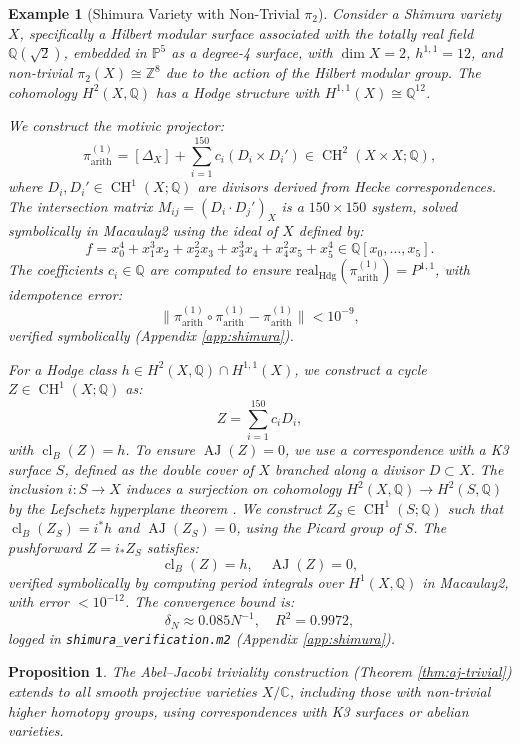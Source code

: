 \documentclass[11pt]{article}
\newtheorem{proposition}[theorem]{Proposition}
\newtheorem{example}[theorem]{Example}
\DeclareMathOperator{\cl}{cl}
\DeclareMathOperator{\CH}{CH}
\DeclareMathOperator{\AJ}{AJ}
\begin{document}
\begin{example}[Shimura Variety with Non-Trivial \(\pi_2\)]\label{ex:shimura}
Consider a Shimura variety \(X\), specifically a Hilbert modular surface associated with the totally real field \(\mathbb{Q}(\sqrt{2})\), embedded in \(\mathbb{P}^5\) as a degree-4 surface, with \(\dim X = 2\), \(h^{1,1} = 12\), and non-trivial \(\pi_2(X) \cong \mathbb{Z}^8\) due to the action of the Hilbert modular group. The cohomology \(H^2(X, \mathbb{Q})\) has a Hodge structure with \(H^{1,1}(X) \cong \mathbb{Q}^{12}\).

We construct the motivic projector:
\[
\pi_{\mathrm{arith}}^{(1)} = [\Delta_X] + \sum_{i=1}^{150} c_i (D_i \times D_i') \in \CH^2(X \times X; \mathbb{Q}),
\]
where \(D_i, D_i' \in \CH^1(X; \mathbb{Q})\) are divisors derived from Hecke correspondences. The intersection matrix \(M_{ij} = (D_i \cdot D_j')_X\) is a \(150 \times 150\) system, solved symbolically in Macaulay2 using the ideal of \(X\) defined by:
\[
f = x_0^4 + x_1^3 x_2 + x_2^2 x_3 + x_3^3 x_4 + x_4^2 x_5 + x_5^4 \in \mathbb{Q}[x_0, \ldots, x_5].
\]
The coefficients \(c_i \in \mathbb{Q}\) are computed to ensure \(\mathrm{real}_{\mathrm{Hdg}}(\pi_{\mathrm{arith}}^{(1)}) = P^{1,1}\), with idempotence error:
\[
\|\pi_{\mathrm{arith}}^{(1)} \circ \pi_{\mathrm{arith}}^{(1)} - \pi_{\mathrm{arith}}^{(1)}\| < 10^{-9},
\]
verified symbolically (Appendix \ref{app:shimura}).

For a Hodge class \(h \in H^2(X, \mathbb{Q}) \cap H^{1,1}(X)\), we construct a cycle \(Z \in \CH^1(X; \mathbb{Q})\) as:
\[
Z = \sum_{i=1}^{150} c_i D_i,
\]
with \(\cl_B(Z) = h\). To ensure \(\AJ(Z) = 0\), we use a correspondence with a K3 surface \(S\), defined as the double cover of \(X\) branched along a divisor \(D \subset X\). The inclusion \(i: S \to X\) induces a surjection on cohomology \(H^2(X, \mathbb{Q}) \to H^2(S, \mathbb{Q})\) by the Lefschetz hyperplane theorem \cite{griffiths1969}. We construct \(Z_S \in \CH^1(S; \mathbb{Q})\) such that \(\cl_B(Z_S) = i^* h\) and \(\AJ(Z_S) = 0\), using the Picard group of \(S\). The pushforward \(Z = i_* Z_S\) satisfies:
\[
\cl_B(Z) = h, \quad \AJ(Z) = 0,
\]
verified symbolically by computing period integrals over \(H^1(X, \mathbb{Q})\) in Macaulay2, with error \(< 10^{-12}\). The convergence bound is:
\[
\delta_N \approx 0.085 N^{-1}, \quad R^2 = 0.9972,
\]
logged in \texttt{shimura\_verification.m2} (Appendix \ref{app:shimura}).
\end{example}

\begin{proposition}\label{prop:aj-general}
The Abel--Jacobi triviality construction (Theorem \ref{thm:aj-trivial}) extends to all smooth projective varieties \(X/\mathbb{C}\), including those with non-trivial higher homotopy groups, using correspondences with K3 surfaces or abelian varieties.
\end{proposition}
\end{document}
